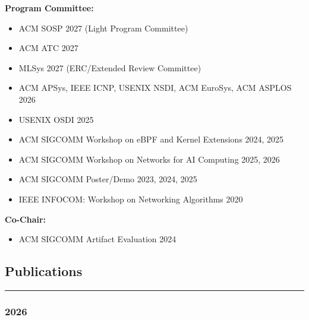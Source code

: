 \documentclass[letterpaper, 11pt]{article}
\begin{document}
\begin{list}{}{\setlength{\leftmargin}{0in}}
    \setlength{\itemsep}{0pt}%
    \setlength{\parskip}{2pt}%

\item {\bf Program Committee:}
    \begin{itemize}
        \setlength{\itemsep}{0pt}%
        \setlength{\parskip}{2pt}%
        \item ACM SOSP 2027 (Light Program Committee)
        \item ACM ATC 2027
        \item MLSys 2027 (ERC/Extended Review Committee)
        \item ACM APSys, IEEE ICNP, USENIX NSDI, ACM EuroSys, ACM ASPLOS 2026
        \item USENIX OSDI 2025
        \item ACM SIGCOMM Workshop on eBPF and Kernel Extensions 2024, 2025
        \item ACM SIGCOMM Workshop on Networks for AI Computing 2025, 2026
        \item ACM SIGCOMM Poster/Demo 2023, 2024, 2025
        \item IEEE INFOCOM: Workshop on Networking Algorithms 2020
    \end{itemize}

\item {\bf Co-Chair:}
    \begin{itemize}
        \setlength{\itemsep}{0pt}%
        \setlength{\parskip}{2pt}%
        \item ACM SIGCOMM Artifact Evaluation 2024
    \end{itemize}
    
\end{list}

\subsection*{\sc Publications}
\hrule\vspace{0.2cm}

\subsubsection*{2026}
\vspace{-0.1cm}
\end{document}
